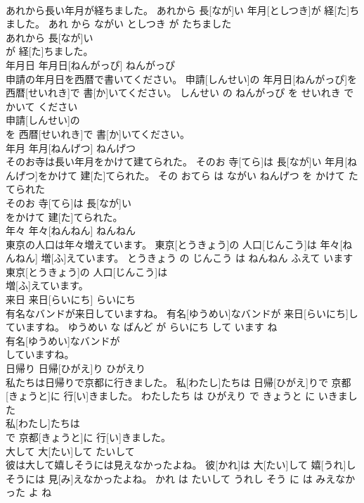 \documentclass[8pt]{extreport}
\begin{document}
\begin{CJK}{UTF8}{min}
\\	あれから長い年月が経ちました。	あれから 長[なが]い 年月[としつき]が 経[た]ちました。	あれ から ながい としつき が たちました	
\\	あれから 長[なが]い
\\	が 経[た]ちました。			
\\	年月日	年月日[ねんがっぴ]	ねんがっぴ	
\\	申請の年月日を西暦で書いてください。	申請[しんせい]の 年月日[ねんがっぴ]を 西暦[せいれき]で 書[か]いてください。	しんせい の ねんがっぴ を せいれき で かいて ください	
\\	申請[しんせい]の
\\	を 西暦[せいれき]で 書[か]いてください。			
\\	年月	年月[ねんげつ]	ねんげつ	
\\	そのお寺は長い年月をかけて建てられた。	そのお 寺[てら]は 長[なが]い 年月[ねんげつ]をかけて 建[た]てられた。	その おてら は ながい ねんげつ を かけて たてられた	
\\	そのお 寺[てら]は 長[なが]い
\\	をかけて 建[た]てられた。			
\\	年々	年々[ねんねん]	ねんねん	
\\	東京の人口は年々増えています。	東京[とうきょう]の 人口[じんこう]は 年々[ねんねん] 増[ふ]えています。	とうきょう の じんこう は ねんねん ふえて います	
\\	東京[とうきょう]の 人口[じんこう]は
\\	増[ふ]えています。			
\\	来日	来日[らいにち]	らいにち	
\\	有名なバンドが来日していますね。	有名[ゆうめい]なバンドが 来日[らいにち]していますね。	ゆうめい な ばんど が らいにち して います ね	
\\	有名[ゆうめい]なバンドが
\\	していますね。			
\\	日帰り	日帰[ひがえ]り	ひがえり	
\\	私たちは日帰りで京都に行きました。	私[わたし]たちは 日帰[ひがえ]りで 京都[きょうと]に 行[い]きました。	わたしたち は ひがえり で きょうと に いきました	
\\	私[わたし]たちは
\\	で 京都[きょうと]に 行[い]きました。			
\\	大して	大[たい]して	たいして	
\\	彼は大して嬉しそうには見えなかったよね。	彼[かれ]は 大[たい]して 嬉[うれ]しそうには 見[み]えなかったよね。	かれ は たいして うれし そう に は みえなかった よ ね	

\end{CJK}
\end{document}
